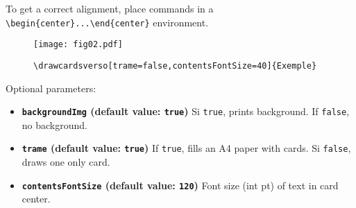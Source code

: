 \documentclass[a4paper, 12pt]{article}
\newcommand{\key}[3]{\textbf{\texttt{#1} (default value: \texttt{#2})} #3}
\newcommand{\commande}[1]{\texttt{\textbackslash#1}}
\begin{document}
To get a correct alignment, place commands in a  \verb!\begin{center}...\end{center}! environment.
\begin{figure}[h]\begin{center}
	\caption{\commande{drawcardsverso[trame=false,contentsFontSize=40]\{Exemple\}}}
	\texttt{[image: fig02.pdf]}\label{fig:verso}
\end{center}\end{figure}

Optional parameters:
\begin{itemize}
	\item \key{backgroundImg}{true}{Si \texttt{true}, prints background. If \texttt{false}, no background.}
	\item \key{trame}{true}{If \texttt{true}, fills an A4 paper with cards. Si \texttt{false}, draws one only card.}
	\item \key{contentsFontSize}{120}{Font size (int pt) of text in card center.}
\end{itemize}
\end{document}
